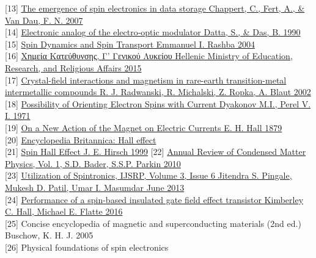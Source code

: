 \documentclass{article}
\begin{document}
[13] \href{https://pubmed.ncbi.nlm.nih.gov/17972936/}{The emergence of spin electronics in data storage
Chappert, C., Fert, A., \& Van Dau, F. N. 
2007}\\[0pt]
[14] \href{https://aip.scitation.org/doi/10.1063/1.102730}{Electronic analog of the electro‐optic modulator
Datta, S., \& Das, B. 
1990}\\[0pt]
[15] \href{https://arxiv.org/pdf/cond-mat/0408119.pdf}{Spin Dynamics and Spin Transport
Emmanuel I. Rashba
2004}\\[0pt]
[16] \href{http://ebooks.edu.gr/ebooks/handle/8547/2359}{Χημεία Κατεύθυνσης, Γ’ Γενικού Λυκείου
Hellenic Ministry of Education, Research, and Religious Affairs
2015}\\[0pt]
[17] \href{https://www.sciencedirect.com/science/article/abs/pii/S0921452602011109?via\%3Dihub}{Crystal-field interactions and magnetism in rare-earth transition-metal intermetallic compounds
R. J. Radwanski, R. Michalski, Z. Ropka, A. Blaut
2002}\\[0pt]
[18] \href{http://www.jetpletters.ac.ru/cgi-bin/articles/download.cgi/1587/article_24366.pdf}{Possibility of Orienting Electron Spins with Current
Dyakonov M.I., Perel V. I.
1971}\\[0pt]
[19] \href{https://web.archive.org/web/20110727010116/http://www.stenomuseet.dk/skoletj/elmag/kilde9.html}{On a New Action of the Magnet on Electric Currents
E. H. Hall
1879}\\[0pt]
[20] \href{https://www.britannica.com/science/Hall-effect}{Encyclopedia Britannica: Hall effect}\\[0pt]
[21] \href{https://journals.aps.org/prl/abstract/10.1103/PhysRevLett.83.1834}{Spin Hall Effect
J. E. Hirsch
1999}
[22] \href{https://www.annualreviews.org/doi/full/10.1146/annurev-conmatphys-070909-104123}{Annual Review of Condensed Matter Physics, Vol. 1,
S.D. Bader, S.S.P. Parkin
2010}\\[0pt]
[23] \href{http://www.ijsrp.org/research-paper-0613.php?rp=P181346}{Utilization of Spintronics, IJSRP, Volume 3, Issue 6
Jitendra S. Pingale, Mukesh D. Patil, Umar I. Masumdar 
June 2013}\\[0pt]
[24] \href{https://aip.scitation.org/doi/10.1063/1.2192152}{Performance of a spin-based insulated gate field effect transistor
Kimberley C. Hall, Michael E. Flatte
2016}\\[0pt]
[25] Concise encyclopedia of magnetic and superconducting materials (2nd ed.)
Buschow, K. H. J.
2005\\[0pt]
[26] Physical foundations of spin electronics
\end{document}
